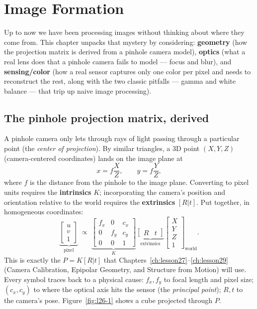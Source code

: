 \chapter{Image Formation}
\label{ch:lesson26}

Up to now we have been processing images without thinking about where they come from. This chapter unpacks that mystery by considering: \textbf{geometry} (how the projection matrix is derived from a pinhole camera model), \textbf{optics} (what a real lens does that a pinhole camera fails to model --- focus and blur), and \textbf{sensing/color} (how a real sensor captures only one color per pixel and needs to reconstruct the rest, along with the two classic pitfalls --- gamma and white balance --- that trip up naive image processing).

\section{The pinhole projection matrix, derived}

A pinhole camera only lets through rays of light passing through a particular point (the \emph{center of projection}). By similar triangles, a 3D point $(X,Y,Z)$ (camera-centered coordinates) lands on the image plane at
\begin{equation}
x = f\frac{X}{Z}, \qquad y = f\frac{Y}{Z},
\end{equation}
where $f$ is the distance from the pinhole to the image plane. Converting to pixel units requires the \textbf{intrinsics} $K$; incorporating the camera's position and orientation relative to the world requires the \textbf{extrinsics} $[R|t]$. Put together, in homogeneous coordinates:
\begin{equation}
\underbrace{\begin{bmatrix}u\\v\\1\end{bmatrix}}_{\text{pixel}} \;\propto\; \underbrace{\begin{bmatrix}f_x&0&c_x\\0&f_y&c_y\\0&0&1\end{bmatrix}}_{K}\underbrace{\begin{bmatrix}R & t\end{bmatrix}}_{\text{extrinsics}}\begin{bmatrix}X\\Y\\Z\\1\end{bmatrix}_{\text{world}}.
\end{equation}
This is exactly the $P=K[R|t]$ that Chapters~\ref{ch:lesson27}--\ref{ch:lesson29} (Camera Calibration, Epipolar Geometry, and Structure from Motion) will use. Every symbol traces back to a physical cause: $f_x,f_y$ to focal length and pixel size; $(c_x,c_y)$ to where the optical axis hits the sensor (the \emph{principal point}); $R,t$ to the camera's pose. Figure~\ref{fig:l26-1} shows a cube projected through $P$.

